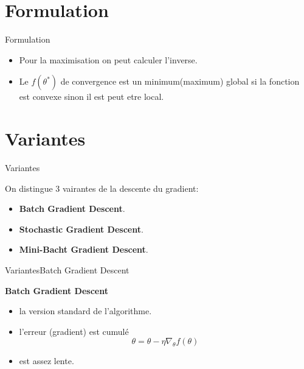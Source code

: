 \documentclass{beamer}
\begin{document}
\section{Formulation}

\begin{frame}{Formulation}{}

\begin{itemize}
	\item Pour la maximisation on peut calculer l'inverse.
	\item Le $f(\theta^{*})$ de convergence est un minimum(maximum) global si la fonction est convexe sinon il est peut etre local.
	
\end{itemize}

\end{frame}

\section{Variantes}

\begin{frame}{Variantes}

On distingue 3 vairantes de la descente du gradient:

\begin{itemize}
	\item \textbf{Batch Gradient Descent}.
	\item \textbf{Stochastic Gradient Descent}.
	\item \textbf{Mini-Bacht Gradient Descent}.
\end{itemize}


\end{frame}

\begin{frame}{Variantes}{Batch Gradient Descent}

	\textbf{Batch Gradient Descent}
	\begin{itemize}
		\item la version standard de l’algorithme.
		\item l'erreur (gradient) est cumulé
			\begin{equation}
			\theta = \theta - \eta \nabla_{\theta}f(\theta)
			\end{equation}
		\item est assez lente.
	\end{itemize}

\end{frame}
\end{document}
